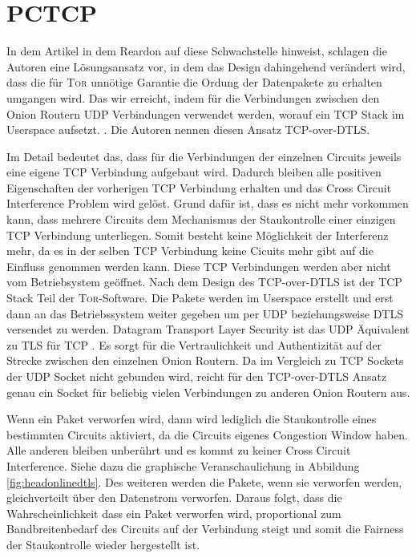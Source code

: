\documentclass[fleqn,envcountsame,runningheads,10pt,a4paper]{llncs}
\begin{document}
\section{PCTCP}
\label{sec:pctcp}

In dem Artikel in dem Reardon auf diese Schwachstelle hinweist, schlagen die Autoren eine Lösungsansatz vor, in dem das Design dahingehend verändert wird, dass die für \textsc{Tor} unnötige Garantie die Ordung der Datenpakete zu erhalten umgangen wird. Das wir erreicht, indem für die Verbindungen zwischen den Onion Routern UDP Verbindungen verwendet werden, worauf ein TCP Stack im Userspace aufsetzt. \cite{tcp-over-dtls}. Die Autoren nennen diesen Ansatz TCP-over-DTLS.

Im Detail bedeutet das, dass für die Verbindungen der einzelnen Circuits jeweils eine eigene TCP Verbindung aufgebaut wird. Dadurch bleiben alle positiven Eigenschaften der vorherigen TCP Verbindung erhalten und das Cross Circuit Interference Problem wird gelöst. Grund dafür ist, dass es nicht mehr vorkommen kann, dass mehrere Circuits dem Mechanismus der Staukontrolle einer einzigen TCP Verbindung unterliegen. Somit besteht keine Möglichkeit der Interferenz mehr, da es in der selben TCP Verbindung keine Cicuits mehr gibt auf die Einfluss genommen werden kann. Diese TCP Verbindungen werden aber nicht vom Betriebsystem geöffnet. Nach dem Design des TCP-over-DTLS ist der TCP Stack Teil der \textsc{Tor}-Software. Die Pakete werden im Userspace erstellt und erst dann an das Betriebssystem weiter gegeben um per UDP beziehungsweise DTLS versendet zu werden. Datagram Transport Layer Security ist das UDP Äquivalent zu TLS für TCP \cite{dtls}. Es sorgt für die Vertraulichkeit und Authentizität auf der Strecke zwischen den einzelnen Onion Routern. Da im Vergleich zu TCP Sockets der UDP Socket nicht gebunden wird, reicht für den TCP-over-DTLS Ansatz genau ein Socket für beliebig vielen Verbindungen zu anderen Onion Routern aus.

Wenn ein Paket verworfen wird, dann wird lediglich die Staukontrolle eines bestimmten Circuits aktiviert, da die Circuits eigenes Congestion Window haben. Alle anderen bleiben unberührt und es kommt zu keiner Cross Circuit Interference. Siehe dazu die graphische Veranschaulichung in Abbildung \ref{fig:headonlinedtls}. Des weiteren werden die Pakete, wenn sie verworfen werden, gleichverteilt über den Datenstrom verworfen. Daraus folgt, dass die Wahrscheinlichkeit dass ein Paket verworfen wird, proportional zum Bandbreitenbedarf des Circuits auf der Verbindung steigt und somit die Fairness der Staukontrolle wieder hergestellt ist.
\end{document}
